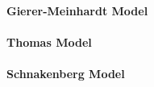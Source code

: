 


\paragraph{Gierer-Meinhardt Model}

\paragraph{Thomas Model}

\paragraph{Schnakenberg Model}










